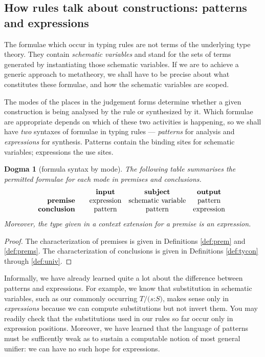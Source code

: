 \documentclass{jfp1}
\newtheorem{dogma}[theorem]{Dogma}
\newcommand{\fsl}{\texttt{/}}
\newcommand{\Pa}[1]{\texttt{(}#1\texttt{)}}
\newcommand{\hb}{\texttt{:}}
\newcommand{\ra}[2]{\Pa{#1 \hb #2}}
\begin{document}
\subsection{How rules talk about constructions: patterns and expressions}

The formulae which occur in typing rules are not terms of the underlying
type theory. They contain \emph{schematic variables} and stand for the sets
of terms generated by instantiating those schematic variables. If we are
to achieve a generic approach to metatheory, we shall have to be precise
about what constitutes these formulae, and how the schematic variables are
scoped.

The modes of the places in the judgement forms determine whether a given
construction is being analysed by the rule or synthesized by it. Which formulae
are appropriate depends on which of these two activities is happening, so
we shall have \emph{two} syntaxes of formulae in typing rules --- \emph{patterns}
for analysis and \emph{expressions} for synthesis. Patterns contain the
binding sites for schematic variables; expressions the use sites.

\begin{dogma}[\label{dogma:mode}formula syntax by mode]
  The following table summarises the permitted formulae for each mode in premises
  and conclusions.
  \[\mbox{\begin{tabular}{r@{~ ~}@{~ ~}c@{~ ~}c@{~ ~}c}
                    & \textbf{input} & \textbf{subject} & \textbf{output} \\
            \textbf{premise}  & expression & schematic variable & pattern \\
     \textbf{conclusion} & pattern & pattern & expression \\
          \end{tabular} }\]
  Moreover, the type given in a context extension for a premise is an expression.
\end{dogma}
\begin{proof}
  The characterization of premises is given in Definitions
  \ref{def:prem} and \ref{def:prems}. The characterization of
  conclusions is given in Definitions \ref{def:tycon} through \ref{def:univ}.
\end{proof}

Informally, we have already learned quite a lot about the difference
between patterns and expressions. For example, we know that
substitution in schematic variables, such as our commonly occurring
$T\fsl\ra sS$, makes sense only in \emph{expressions} because we
can compute substitutions but not invert them. You may readily check
that the substitutions used in our rules so far occur only in
expression positions. Moreover, we have learned that the language of
patterns must be sufficently weak as to sustain a computable notion of
most general unifier: we can have no such hope for expressions.
\end{document}
